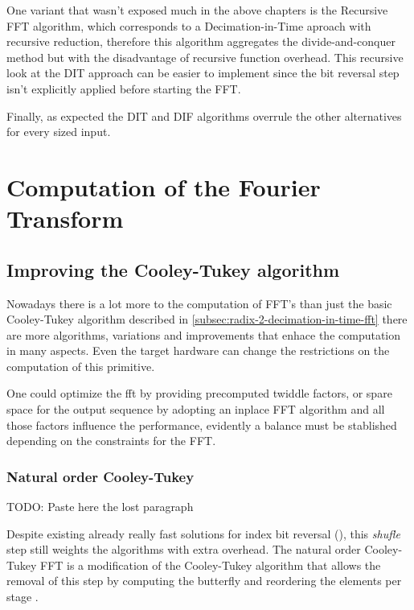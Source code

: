 \documentclass[
  oneside,
  11pt, a4paper,
  footinclude=true,
  headinclude=true,
  cleardoublepage=empty
]{scrbook}
\begin{document}
One variant that wasn't exposed much in the above chapters is the Recursive FFT algorithm, which corresponds to a Decimation-in-Time aproach with recursive reduction, therefore this algorithm aggregates the divide-and-conquer method but with the disadvantage of recursive function overhead. This recursive look at the DIT approach can be easier to implement since the bit reversal step isn't explicitly applied before starting the FFT.

Finally, as expected the DIT and DIF algorithms overrule the other alternatives for every sized input.



\chapter{Computation of the Fourier Transform}


\section{Improving the Cooley-Tukey algorithm}
Nowadays there is a lot more to the computation of FFT's than just the basic Cooley-Tukey algorithm described in \ref{subsec:radix-2-decimation-in-time-fft} there are more algorithms, variations and improvements that enhace the computation in many aspects. Even the target hardware can change the restrictions on the computation of this primitive.

One could optimize the fft by providing precomputed twiddle factors, or spare space for the output sequence by adopting an inplace FFT algorithm  and all those factors influence the performance, evidently a balance must be stablished depending on the constraints for the FFT.

\subsection{Natural order Cooley-Tukey} \label{subsec:natural-order-ct}

TODO: Paste here the lost paragraph

Despite existing already really fast solutions for index bit reversal (\cite{prado2004new}), this \textit{shufle} step still weights the algorithms with extra overhead. The natural order Cooley-Tukey FFT is a modification of the Cooley-Tukey algorithm that allows the removal of this step by computing the butterfly and reordering the elements per stage \cite{OTFFTnoct}.
\end{document}
